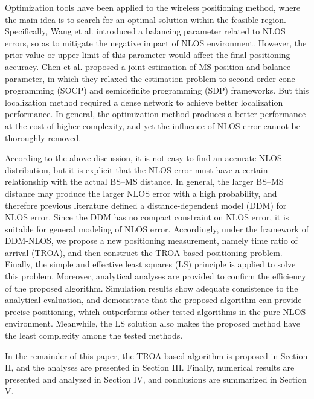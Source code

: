 \documentclass[journal]{IEEEtran}
\begin{document}
Optimization tools have been applied to the wireless positioning method, where the main idea is to search for an optimal solution within the feasible region\cite{re29,re30,re31}. Specifically, Wang et al. \cite{re29} introduced a balancing parameter related to NLOS errors, so as to mitigate the negative impact of NLOS environment. However, the prior value or upper limit of this parameter would affect the final positioning accuracy. Chen et al. \cite{re32} proposed a joint estimation of MS position and balance parameter, in which they relaxed the estimation problem to second-order cone programming (SOCP) and semidefinite programming (SDP) frameworks. But this localization method required a dense network to achieve better localization performance. In general, the optimization method produces a better performance at the cost of higher complexity, and yet the influence of NLOS error cannot be thoroughly removed.

According to the above discussion, it is not easy to find an accurate NLOS distribution, but it is explicit that the NLOS error must have a certain relationship with the actual BS--MS distance. In general, the larger BS--MS distance may produce the larger NLOS error with a high probability, and therefore previous literature \cite{re26,re33} defined a distance-dependent model (DDM) for NLOS error. Since the DDM has no compact constraint on NLOS error, it is suitable for general modeling of NLOS error. Accordingly, under the framework of DDM-NLOS, we propose a new positioning measurement, namely time ratio of arrival (TROA), and then construct the TROA-based positioning problem. Finally, the simple and effective least squares (LS) principle is applied to solve this problem. Moreover, analytical analyses are provided to confirm the efficiency of the proposed algorithm. Simulation results show adequate consistence to the analytical evaluation, and demonstrate that the proposed algorithm can provide precise positioning, which outperforms other tested algorithms in the pure NLOS environment. Meanwhile, the LS solution also makes the proposed method have the least complexity among the tested methods.

In the remainder of this paper, the TROA based algorithm is proposed in Section II, and the analyses are presented in Section III. Finally, numerical results are presented and analyzed in Section IV, and conclusions are summarized in Section V.
\end{document}
